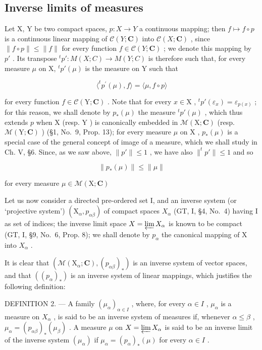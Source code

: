 \subsection{Inverse limits of measures}

Let X, Y be two compact spaces, \(p : X \to Y\) a continuous mapping; then \(f \mapsto f \circ p\) is a continuous linear mapping of \(\mathcal{C}(Y; \mathbf{C})\) into \(\mathcal{C}(X; \mathbf{C})\) , since \(\|f \circ p\| \leqslant \|f\|\) for every function \(f \in \mathcal{C}(Y; \mathbf{C})\) ; we denote this mapping by \(p'\) . Its transpose \(^{t}p' : M(X; C) \to M(Y; C)\) is therefore such that, for every measure \(\mu\) on X, \(^{t}p'(\mu)\) is the measure on Y such that

\[
\langle^ {t} p ^ {\prime} (\mu), f \rangle = \langle \mu , f \circ p \rangle
\]

for every function \(f \in \mathcal{C}(\mathrm{Y};\mathbf{C})\) . Note that for every \(x \in \mathrm{X}\) , \(^t p'(\varepsilon_x) = \varepsilon_{p(x)}\) ; for this reason, we shall denote by \(p_*(\mu)\) the measure \(^t p'(\mu)\) , which thus extends \(p\) when \(\mathrm{X}\) (resp. \(\mathrm{Y}\) ) is canonically embedded in \(\mathcal{M}(\mathrm{X};\mathbf{C})\) (resp. \(\mathcal{M}(\mathrm{Y};\mathbf{C})\) ) (§1, No.~9, Prop. 13); for every measure \(\mu\) on \(\mathrm{X}\) , \(p_*(\mu)\) is a special case of the general concept of image of a measure, which we shall study in Ch. V, §6. Since, as we saw above, \(\| p' \| \leqslant 1\) , we have also \(\| ^t p' \| \leqslant 1\) and so

\[
\| p _ {*} (\mu) \| \leqslant \| \mu \|\tag{15}
\]

for every measure \(\mu \in \mathcal{M}(\mathrm{X};\mathbf{C})\)

Let us now consider a directed pre-ordered set I, and an inverse system (or `projective system') \((\mathrm{X}_{\alpha}, p_{\alpha\beta})\) of compact spaces \(X_{\alpha}\) (GT, I, §4, No.~4) having I as set of indices; the inverse limit space \(X = \varprojlim X_{\alpha}\) is known to be compact (GT, I, §9, No.~6, Prop. 8); we shall denote by \(p_{\alpha}\) the canonical mapping of X into \(X_{\alpha}\) .

It is clear that \((\mathcal{M}(\mathrm{X}_{\alpha};\mathbf{C}),(p_{\alpha\beta})_{*})\) is an inverse system of vector spaces, and that \(((p_{\alpha})_{*})\) is an inverse system of linear mappings, which justifies the following definition:

DEFINITION 2. --- A family \((\mu_{\alpha})_{\alpha \in I}\) , where, for every \(\alpha \in I\) , \(\mu_{\alpha}\) is a measure on \(X_{\alpha}\) , is said to be an inverse system of measures if, whenever \(\alpha \leqslant \beta\) , \(\mu_{\alpha} = (p_{\alpha \beta})_{*}(\mu_{\beta})\) . A measure \(\mu\) on \(X = \varprojlim X_{\alpha}\) is said to be an inverse limit of the inverse system \((\mu_{\alpha})\) if \(\mu_{\alpha} = (p_{\alpha})_{*}(\mu)\) for every \(\alpha \in I\) .

